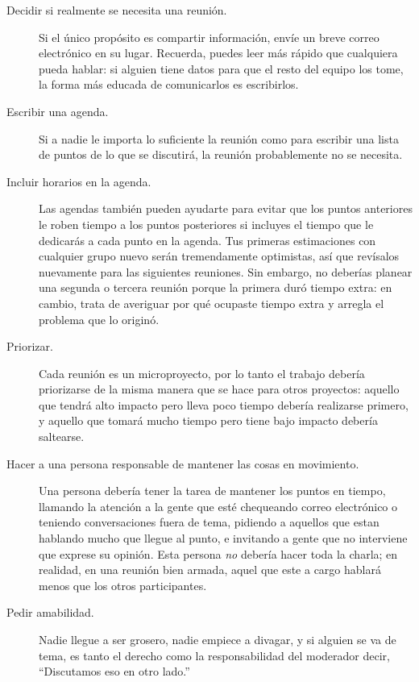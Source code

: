 \begin{description}

\item[Decidir si realmente se necesita una reunión.]
  Si el único propósito es compartir información,
  envíe un breve correo electrónico en su lugar.
  Recuerda,
  puedes leer más rápido que cualquiera pueda hablar:
  si alguien tiene datos para que el resto del equipo los tome,
  la forma más educada de comunicarlos es escribirlos.

\item[Escribir una agenda.]
  Si a nadie le importa lo suficiente la reunión como para escribir una lista de puntos
  de lo que se discutirá,
  la reunión probablemente no se necesita.

\item[Incluir horarios en la agenda.]
  Las agendas también pueden ayudarte para evitar que los puntos  anteriores le roben tiempo a los puntos posteriores
  si incluyes el tiempo que le dedicarás a cada punto en la agenda.
  Tus primeras estimaciones con cualquier grupo nuevo serán tremendamente optimistas,
  así que revísalos nuevamente para las siguientes reuniones.
  Sin embargo,
  no deberías planear una segunda o tercera reunión
  porque la primera duró tiempo extra:
  en cambio,
  trata de averiguar por qué ocupaste tiempo extra y arregla el problema que lo originó. 

\item[Priorizar.]
  Cada reunión es un microproyecto,
  por lo tanto el trabajo debería priorizarse de la misma manera que se hace para otros proyectos:
  aquello que tendrá alto impacto pero lleva poco tiempo debería realizarse primero,
  y aquello que tomará mucho tiempo pero tiene bajo impacto debería saltearse.

\item[Hacer a una persona responsable de mantener las cosas en movimiento.]
  Una persona debería tener la tarea de mantener los puntos en tiempo,
  llamando la atención a la gente que esté chequeando correo electrónico o  teniendo  conversaciones fuera de tema,
  pidiendo a aquellos que estan hablando mucho que llegue al punto,
  e invitando a gente que no interviene que exprese su opinión.
  Esta persona \emph{no} debería hacer toda la charla;
  en realidad, 
  en una reunión bien armada, aquel que este a cargo hablará menos 
  que los otros participantes.

\item[Pedir amabilidad.]
  Nadie llegue a ser grosero,
  nadie empiece a divagar,
  y si alguien se va de tema,
  es tanto el derecho como la responsabilidad del moderador decir,
  ``Discutamos eso en otro lado.''


\end{description}
